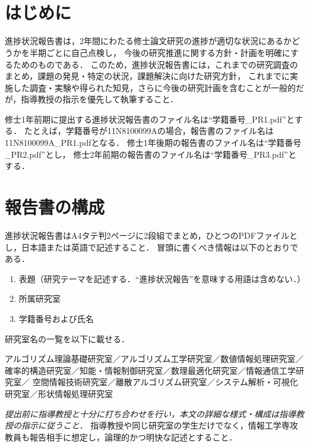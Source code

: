 \documentclass[10pt,a4paper,notitlepage,oneside,twocolumn]{abst_ltjsarticle}
\title{
\textbf{\textgt{タイトル}}
}
\author{\begin{center}
{\large \textbf{\textgt{11N8101099A　草野 みどり}}}\\
{\large \textbf{\textgt{情報工学専攻　●●研究室}}}\\
{\large \textbf{\textgt{20XX年X月}}}
\end{center}}
\date{}
\begin{document}
\maketitle


\section{はじめに} \label{sec:intro}

進捗状況報告書は，2年間にわたる修士論文研究の進捗が適切な状況にあるかどうかを半期ごとに自己点検し，
今後の研究推進に関する方針・計画を明確にするためのものである．
このため，進捗状況報告書には，これまでの研究調査のまとめ，課題の発見・特定の状況，課題解決に向けた研究方針，
これまでに実施した調査・実験や得られた知見，さらに今後の研究計画を含むことが一般的だが，指導教授の指示を優先して執筆すること．

修士1年前期に提出する進捗状況報告書のファイル名は“学籍番号\_PR1.pdf”とする．
たとえば，学籍番号が11N8100099Aの場合，報告書のファイル名は11N8100099A\_PR1.pdfとなる．
修士1年後期の報告書のファイル名は“学籍番号\_PR2.pdf”とし，
修士2年前期の報告書のファイル名は“学籍番号\_PR3.pdf”とする．



\section{報告書の構成}

進捗状況報告書はA4タテ判2ページに2段組でまとめ，ひとつのPDFファイルとし，日本語または英語で記述すること．
冒頭に書くべき情報は以下のとおりである．
\begin{enumerate}
\item 表題（研究テーマを記述する．“進捗状況報告”を意味する用語は含めない．）
\item 所属研究室
\item 学籍番号および氏名
\end{enumerate}
研究室名の一覧を以下に載せる．

\smallskip

\noindent
アルゴリズム理論基礎研究室／アルゴリズム工学研究室／数値情報処理研究室／
確率的構造研究室／知能・情報制御研究室／数理最適化研究室／情報通信工学研究室／
空間情報技術研究室／離散アルゴリズム研究室／システム解析・可視化研究室／形状情報処理研究室

\smallskip


{\em 提出前に指導教授と十分に打ち合わせを行い，本文の詳細な様式・構成は指導教授の指示に従うこと．}
指導教授や同じ研究室の学生だけでなく，情報工学専攻教員も報告相手に想定し，論理的かつ明快な記述とすること．
\end{document}
